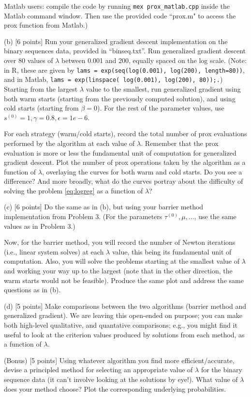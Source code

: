 Matlab users: compile the code by running {\tt mex prox\_matlab.cpp}
inside the Matlab command window. Then use the provided code ``prox.m"
to access the prox function from Matlab.) 

(b) [6 points] Run your generalized gradient descent implementation
on the binary sequences data, provided in ``binseq.txt''. Run generalized
gradient descent over 80 values of $\lambda$ between 0.001 and 200, equally 
spaced on the log scale. 
(Note: in R, these are given by
%
{\tt lams = exp(seq(log(0.001), log(200), length=80))}, and in Matlab,
%
{\tt lams = exp(linspace( log(0.001), log(200), 80));.})
Starting from the largest $\lambda$ value to the smallest, run generalized
gradient using both warm starts (starting from the previously computed
solution), and using cold starts (starting from $\beta=0$).
For the rest of the parameter values, use 
$s^{(0)}=1,\gamma=0.8,\epsilon=1e-6$.

For each strategy (warm/cold starts), record the total number of prox evaluations 
performed by the algorithm at each value of $\lambda$. Remember that the prox 
evaluation is more or less the fundamental unit of computation for generalized 
gradient descent. Plot the number of prox operations taken by the algorithm as a 
function of $\lambda$, overlaying the curves for both warm and cold starts. Do you
see a difference? And more broadly, what do the curves portray about the 
difficulty of solving the problem \eqref{eq:logreg} as a function of $\lambda$? 

(c) [6 points] Do the same as in (b), but using your barrier method implementation
from Problem 3. (For the parameters $\tau^{(0)},\mu,\ldots$, use the same values as 
in Problem 3.)

Now, for the barrier method, you will record the number of
Newton iterations (i.e., linear system solves) at each $\lambda$ value, this
being its fundamental unit of computation. Also, you will solve the problems
starting at the smallest value of $\lambda$ and working your way up to the
largest (note that in the other direction, the warm starts would not be feasible).
Produce the same plot and address the same questions as in (b). 

(d) [5 points] Make comparisons between the two algorithms (barrier method and 
generalized gradient). We are leaving this open-ended on purpose; you can make both
high-level qualitative, and quantative comparisons; e.g., you might find it useful
to look at the criterion values produced by solutions from each method, as a function
of $\lambda$. 

(Bonus) [5 points] Using whatever algorithm you find more efficient/accurate, devise
a principled method for selecting an appropriate value of $\lambda$ for the binary 
sequence data (it can't involve looking at the solutions by eye!). What value of 
$\lambda$ does your method choose? Plot the corresponding underlying probabilities.

